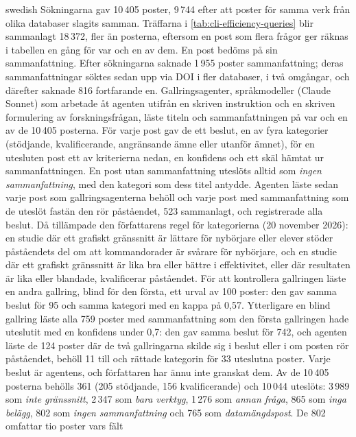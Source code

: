 \begin{onlyin}{swedish}
Sökningarna gav 10\,405 poster, 9\,744 efter att poster för samma verk
från olika databaser slagits samman.  Träffarna i
\cref{tab:cli-efficiency-queries} blir sammanlagt 18\,372, fler än
posterna, eftersom en post som flera frågor ger räknas i tabellen en gång
för var och en av dem.  En post bedöms på sin sammanfattning.  Efter
sökningarna saknade 1\,955 poster sammanfattning; deras sammanfattningar
söktes sedan upp via DOI i fler databaser, i två omgångar, och därefter
saknade 816 fortfarande en.  Gallringsagenter, språkmodeller (Claude Sonnet)
som arbetade åt
agenten utifrån en skriven instruktion och en skriven formulering av
forskningsfrågan, läste titeln och sammanfattningen på var och en av de
10\,405 posterna.  För varje post gav de ett beslut, en av fyra
kategorier (stödjande, kvalificerande, angränsande ämne eller utanför
ämnet), för en utesluten post ett av kriterierna nedan, en konfidens och
ett skäl hämtat ur sammanfattningen.  En post utan sammanfattning
uteslöts alltid som \emph{ingen sammanfattning}, med den kategori som
dess titel antydde.  Agenten läste sedan varje post som gallringsagenterna
behöll och varje post med sammanfattning som de uteslöt fastän den rör
påståendet, 523 sammanlagt, och registrerade alla beslut.  Då tillämpade den
författarens regel för kategorierna (20 november 2026): en studie där ett
grafiskt gränssnitt är lättare för nybörjare eller elever stöder
påståendets del om att kommandorader är svårare för nybörjare, och en
studie där ett grafiskt gränssnitt är lika bra eller bättre i
effektivitet, eller där resultaten är lika eller blandade, kvalificerar
påståendet.  För att kontrollera gallringen läste en andra gallring, blind
för den första, ett urval av 100 poster: den gav samma beslut för 95 och
samma kategori med en kappa på 0,57.  Ytterligare en blind gallring läste
alla 759 poster med sammanfattning som den första gallringen hade
uteslutit med en konfidens under 0,7: den gav samma beslut för 742, och
agenten läste de 124 poster där de två gallringarna skilde sig i beslut
eller i om posten rör påståendet, behöll 11 till och rättade kategorin för
33 uteslutna poster.  Varje beslut är agentens, och författaren har ännu
inte granskat dem.  Av de 10\,405 posterna behölls 361 (205 stödjande,
156 kvalificerande) och 10\,044 uteslöts: 3\,989 som \emph{inte
gränssnitt}, 2\,347 som \emph{bara verktyg}, 1\,276 som \emph{annan
fråga}, 865 som \emph{inga belägg}, 802 som \emph{ingen sammanfattning}
och 765 som \emph{datamängdspost}.  De 802 omfattar tio poster vars fält

\end{onlyin}
